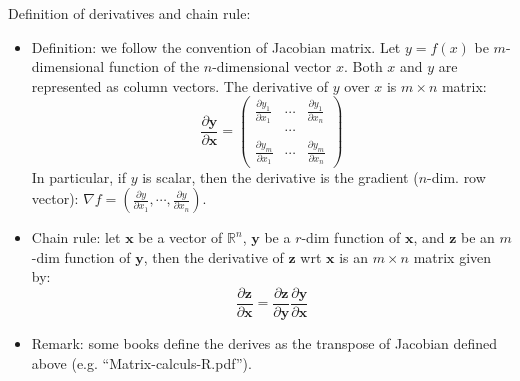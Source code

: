 \documentclass{report}
\begin{document}
Definition of derivatives and chain rule: 
\begin{itemize}
\item Definition: we follow the convention of Jacobian matrix. Let $y=f(x)$ be $m$-dimensional function of the $n$-dimensional vector $x$. Both $x$ and $y$ are represented as column vectors. The derivative of $y$ over $x$ is $m \times n$ matrix: 
\begin{equation}
\frac{\partial \mathbf{y}}{\partial \mathbf{x}} = \left( 
\begin{array}{llll}
\frac{\partial y_1}{\partial x_1} & \cdots & \frac{\partial y_1}{\partial x_n}\\
 & \cdots & \\
\frac{\partial y_m}{\partial x_1} & \cdots & \frac{\partial y_m}{\partial x_n} 
\end{array}
\right)
\end{equation}
In particular, if $y$ is scalar, then the derivative is the gradient ($n$-dim. row vector): $\nabla f = (\frac{\partial y}{\partial x_1}, \cdots, \frac{\partial y}{\partial x_n})$. 

\item Chain rule: let $\mathbf{x}$ be a vector of $\mathbb{R}^n$, $\mathbf{y}$ be a $r$-dim function of $\mathbf{x}$, and $\mathbf{z}$ be an $m$-dim function of $\mathbf{y}$, then the derivative of $\mathbf{z}$ wrt $\mathbf{x}$ is an $m \times n$ matrix given by: 
\begin{equation}
\frac{\partial \mathbf{z}}{\partial \mathbf{x}}	= \frac{\partial \mathbf{z}}{\partial \mathbf{y}} \frac{\partial \mathbf{y}}{\partial \mathbf{x}}
\end{equation}


\item Remark: some books define the derives as the transpose of Jacobian defined above (e.g. ``Matrix-calculs-R.pdf''). 
\end{itemize}
\end{document}
